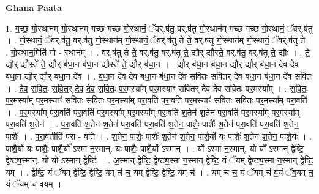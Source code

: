 \documentclass[17pt]{extarticle}
\begin{document}
\textbf{Ghana Paata } \newline

1. ग॒च्छ॒ गो॒स्थान॑म् गो॒स्थान॑म् गच्छ गच्छ गो॒स्थानं॒ ॅवर्.ष॑तु॒ वर्.ष॑तु गो॒स्थान॑म् गच्छ गच्छ गो॒स्थानं॒ ॅवर्.ष॑तु । . गो॒स्थानं॒ ॅवर्.ष॑तु॒ वर्.ष॑तु गो॒स्थान॑म् गो॒स्थानं॒ ॅवर्.ष॑तु ते ते॒ वर्.ष॑तु गो॒स्थान॑म् गो॒स्थानं॒ ॅवर्.ष॑तु ते । . गो॒स्थान॒मिति॑ गो - स्थान᳚म् । . वर्.ष॑तु ते ते॒ वर्.ष॑तु॒ वर्.ष॑तु ते॒ द्यौर् द्यौस्ते॒ वर्.ष॑तु॒ वर्.ष॑तु ते॒ द्यौः । . ते॒ द्यौर् द्यौस्ते॑ ते॒ द्यौर् ब॑धा॒न ब॑धा॒न द्यौस्ते॑ ते॒ द्यौर् ब॑धा॒न । . द्यौर् ब॑धा॒न ब॑धा॒न द्यौर् द्यौर् ब॑धा॒न दे॑व देव बधा॒न द्यौर् द्यौर् ब॑धा॒न दे॑व । . ब॒धा॒न दे॑व देव बधा॒न ब॑धा॒न दे॑व सवितः सवितर् देव बधा॒न ब॑धा॒न दे॑व सवितः । . दे॒व॒ स॒वि॒तः॒ स॒वि॒त॒र् दे॒व॒ दे॒व॒ स॒वि॒तः॒ प॒र॒मस्या᳚म् पर॒मस्याꣳ॑ सवितर् देव देव सवितः पर॒मस्या᳚म् । . स॒वि॒तः॒ प॒र॒मस्या᳚म् पर॒मस्याꣳ॑ सवितः सवितः पर॒मस्या᳚म् परा॒वति॑ परा॒वति॑ पर॒मस्याꣳ॑ सवितः सवितः पर॒मस्या᳚म् परा॒वति॑ । . प॒र॒मस्या᳚म् परा॒वति॑ परा॒वति॑ पर॒मस्या᳚म् पर॒मस्या᳚म् परा॒वति॑ श॒तेन॑ श॒तेन॑ परा॒वति॑ पर॒मस्या᳚म् पर॒मस्या᳚म् परा॒वति॑ श॒तेन॑ । . प॒रा॒वति॑ श॒तेन॑ श॒तेन॑ परा॒वति॑ परा॒वति॑ श॒तेन॒ पाशैः॒ पाशैः᳚ श॒तेन॑ परा॒वति॑ परा॒वति॑ श॒तेन॒ पाशैः᳚ । . प॒रा॒वतीति॑ परा - वति॑ । . श॒तेन॒ पाशैः॒ पाशैः᳚ श॒तेन॑ श॒तेन॒ पाशै॒र्यो यः पाशैः᳚ श॒तेन॑ श॒तेन॒ पाशै॒र्यः । . पाशै॒र्यो यः पाशैः॒ पाशै॒र्यो᳚ ऽस्मा न॒स्मान्. यः पाशैः॒ पाशै॒र्यो᳚ ऽस्मान् । . यो᳚ ऽस्मा न॒स्मान्. यो यो᳚ ऽस्मान् द्वेष्टि॒ द्वेष्ट्य॒स्मान्. यो यो᳚ ऽस्मान् द्वेष्टि॑ । . अ॒स्मान् द्वेष्टि॒ द्वेष्ट्य॒स्मा न॒स्मान् द्वेष्टि॒ यं ॅयम् द्वेष्ट्य॒स्मा न॒स्मान् द्वेष्टि॒ यम् । . द्वेष्टि॒ यं ॅयम् द्वेष्टि॒ द्वेष्टि॒ यम् च॑ च॒ यम् द्वेष्टि॒ द्वेष्टि॒ यम् च॑ । . यम् च॑ च॒ यं ॅयम् च॑ व॒यं ॅव॒यम् च॒ यं ॅयम् च॑ व॒यम् । \newline
\end{document}
